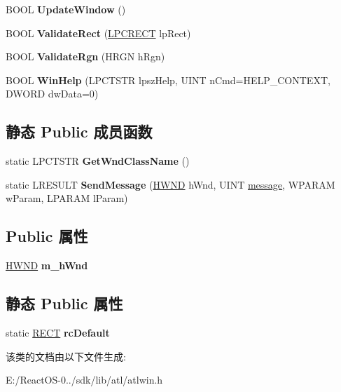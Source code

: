 \begin{DoxyCompactItemize}
B\+O\+OL {\bfseries Update\+Window} ()
\item 
\mbox{\label{class_a_t_l_1_1_c_window_a8980afc6e5876bdbf623aff3d2094c08}} 
B\+O\+OL {\bfseries Validate\+Rect} (\hyperlink{structtag_r_e_c_t}{L\+P\+C\+R\+E\+CT} lp\+Rect)
\item 
\mbox{\label{class_a_t_l_1_1_c_window_afa2d260bbcc9355bd9e8d85378a64301}} 
B\+O\+OL {\bfseries Validate\+Rgn} (H\+R\+GN h\+Rgn)
\item 
\mbox{\label{class_a_t_l_1_1_c_window_ae8664bbf228fff062b9f246fd0998fa6}} 
B\+O\+OL {\bfseries Win\+Help} (L\+P\+C\+T\+S\+TR lpsz\+Help, U\+I\+NT n\+Cmd=H\+E\+L\+P\+\_\+\+C\+O\+N\+T\+E\+XT, D\+W\+O\+RD dw\+Data=0)
\end{DoxyCompactItemize}
\subsection*{静态 Public 成员函数}
\begin{DoxyCompactItemize}
\item 
\mbox{\label{class_a_t_l_1_1_c_window_ad4fe2ec17c0375effc6e37d23bf084c6}} 
static L\+P\+C\+T\+S\+TR {\bfseries Get\+Wnd\+Class\+Name} ()
\item 
\mbox{\label{class_a_t_l_1_1_c_window_aada0fc461aa7bede542f0ea413ab5fb8}} 
static L\+R\+E\+S\+U\+LT {\bfseries Send\+Message} (\hyperlink{interfacevoid}{H\+W\+ND} h\+Wnd, U\+I\+NT \hyperlink{structmessage}{message}, W\+P\+A\+R\+AM w\+Param, L\+P\+A\+R\+AM l\+Param)
\end{DoxyCompactItemize}
\subsection*{Public 属性}
\begin{DoxyCompactItemize}
\item 
\mbox{\label{class_a_t_l_1_1_c_window_aa68bed72d3e72cd9dafdf4f560bbbf6d}} 
\hyperlink{interfacevoid}{H\+W\+ND} {\bfseries m\+\_\+h\+Wnd}
\end{DoxyCompactItemize}
\subsection*{静态 Public 属性}
\begin{DoxyCompactItemize}
\item 
\mbox{\label{class_a_t_l_1_1_c_window_af2b2089d5ea4e9a2ba866610102ea18b}} 
static \hyperlink{structtag_r_e_c_t}{R\+E\+CT} {\bfseries rc\+Default}
\end{DoxyCompactItemize}


该类的文档由以下文件生成\+:\begin{DoxyCompactItemize}
\item 
E\+:/\+React\+O\+S-\/0../sdk/lib/atl/atlwin.\+h\end{DoxyCompactItemize}
